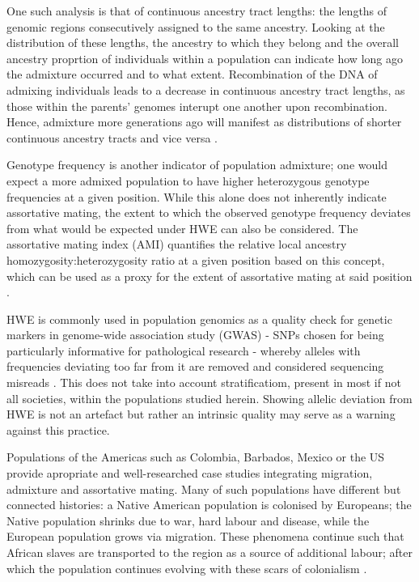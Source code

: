 \documentclass[11pt]{article}
\begin{document}
One such analysis is that of continuous ancestry tract lengths: the lengths of genomic regions consecutively assigned to the same ancestry. Looking at the distribution of these lengths, the ancestry to which they belong and the overall ancestry proprtion of individuals within a population can indicate how long ago the admixture occurred and to what extent. Recombination of the DNA of admixing individuals leads to a decrease in continuous ancestry tract lengths, as those within the parents' genomes interupt one another upon recombination. Hence, admixture more generations ago will manifest as distributions of shorter continuous ancestry tracts and vice versa \parencite{Gravel2012}. 

Genotype frequency is another indicator of population admixture; one would expect a more admixed population to have higher heterozygous genotype frequencies at a given position. While this alone does not inherently indicate assortative mating, the extent to which the observed genotype frequency deviates from what would be expected under HWE can also be considered. The assortative mating index (AMI) quantifies the relative local ancestry homozygosity:heterozygosity ratio at a given position based on this concept, which can be used as a proxy for the extent of assortative mating at said position \parencite{Norris2019}.

HWE is commonly used in population genomics as a quality check for genetic markers in genome-wide association study (GWAS) - SNPs chosen for being particularly informative for pathological research - whereby alleles with frequencies deviating too far from it are removed and considered sequencing misreads \parencite{Linares-Pineda2012}. This does not take into account stratificatiom, present in most if not all societies, within the populations studied herein. Showing allelic deviation from HWE is not an artefact but rather an intrinsic quality may serve as a warning against this practice.

Populations of the Americas such as Colombia, Barbados, Mexico or the US provide apropriate and well-researched case studies integrating migration, admixture and assortative mating. Many of such populations have different but connected histories: a Native American population is colonised by Europeans; the Native population shrinks due to war, hard labour and disease, while the European population grows via migration. These phenomena continue such that African slaves are transported to the region as a source of additional labour; after which the population continues evolving with these scars of colonialism \parencite{Bryc2010,Mas-Sandoval2019,ESilva2020}. 
\end{document}
